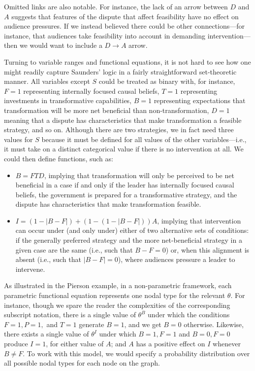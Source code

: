 \documentclass[
  12pt,
]{book}
\providecommand{\tightlist}{%
  \setlength{\itemsep}{0pt}\setlength{\parskip}{0pt}}
\begin{document}
Omitted links are also notable. For instance, the lack of an arrow between \(D\) and \(A\) suggests that features of the dispute that affect feasibility have no effect on audience pressures. If we instead believed there could be other connections---for instance, that audiences take feasibility into account in demanding intervention---then we would want to include a \(D \rightarrow A\) arrow.

Turning to variable ranges and functional equations, it is not hard to see how one might readily capture Saunders' logic in a fairly straightforward set-theoretic manner. All variables except \(S\) could be treated as binary with, for instance, \(F=1\) representing internally focused causal beliefs, \(T=1\) representing investments in transformative capabilities, \(B=1\) representing expectations that transformation will be more net beneficial than non-transformation, \(D=1\) meaning that a dispute has characteristics that make transformation a feasible strategy, and so on. Although there are two strategies, we in fact need three values for \(S\) because it must be defined for all values of the other variables---i.e., it must take on a distinct categorical value if there is no intervention at all. We could then define functions, such as:

\begin{itemize}
\tightlist
\item
  \(B=FTD\), implying that transformation will only be perceived to be net beneficial in a case if and only if the leader has internally focused causal beliefs, the government is prepared for a transformative strategy, and the dispute has characteristics that make transformation feasible.
\item
  \(I=(1-|B-F|)+(1-(1-|B-F|))A\), implying that intervention can occur under (and only under) either of two alternative sets of conditions: if the generally preferred strategy and the more net-beneficial strategy in a given case are the same (i.e., such that \(B-F=0\)) or, when this alignment is absent (i.e., such that \(|B-F|=0\)), where audiences pressure a leader to intervene.
\end{itemize}

As illustrated in the Pierson example, in a non-parametric framework, each parametric functional equation represents one nodal type for the relevant \(\theta\). For instance, though we spare the reader the complexities of the corresponding subscript notation, there is a single value of \(\theta^B\) under which the conditions \(F=1, P=1,\) and \(T=1\) generate \(B=1\), and we get \(B=0\) otherwise. Likewise, there exists a single value of \(\theta^I\) under which \(B=1, F=1\) and \(B=0, F=0\) produce \(I=1\), for either value of \(A\); and \(A\) has a positive effect on \(I\) whenever \(B \neq F\). To work with this model, we would specify a probability distribution over all possible nodal types for each node on the graph.
\end{document}
